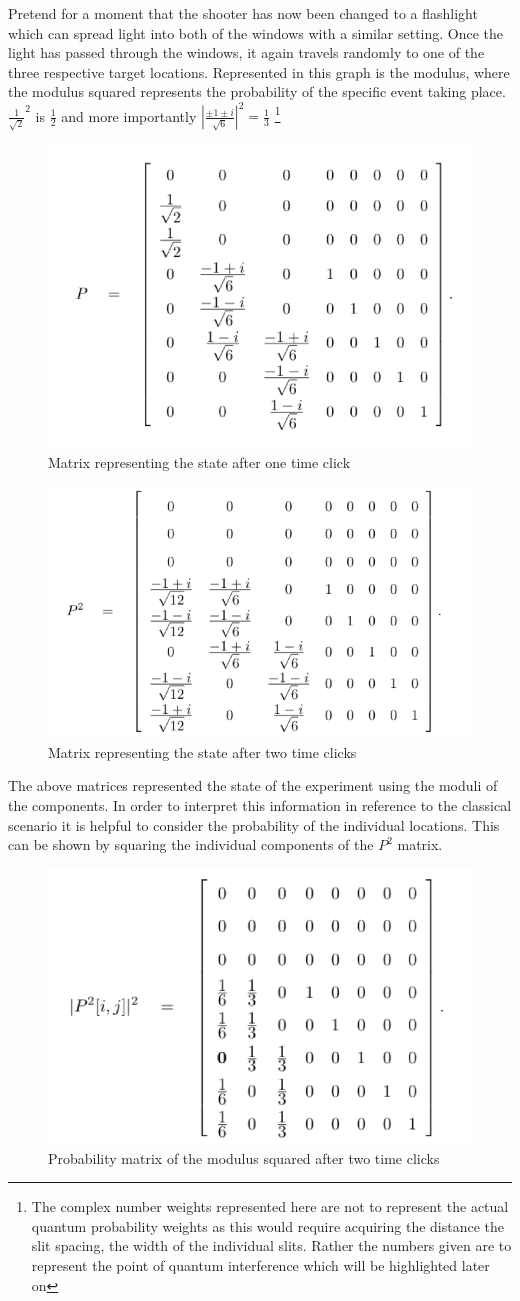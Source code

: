 \documentclass[12pt]{article}
\begin{document}
Pretend for a moment that the shooter has now been changed to a flashlight which can spread light into both of the windows with a similar setting. Once the light has passed through the windows, it again travels randomly to one of the three respective target locations. Represented in this graph is the modulus, where the modulus squared represents the probability of the specific event taking place. $\frac{1}{\sqrt{2}}^2$ is $\frac{1}{2}$ and more importantly $\left|\frac{\pm 1 \pm i }{\sqrt{6}}\right|^2 = \frac{1}{3}$  \footnote{The complex number weights represented here are not to represent the actual quantum probability weights as this would require acquiring the distance the slit spacing, the width of the individual slits. Rather the numbers given are to represent the point of quantum interference which will be highlighted later on}
\begin{figure}[!h]
	\centering
	\caption{Matrix representing the state after one time click}
	\includegraphics[width=.5\textwidth]{quantumP}
\end{figure}
\begin{figure}[!h]
	\centering
	\caption{Matrix representing the state after two time clicks}
	\includegraphics[width=.5\textwidth]{QuantumP2}
\end{figure}
The above matrices represented the state of the experiment using the moduli of the components. In order to interpret this information in reference to the classical scenario it is helpful to consider the probability of the individual locations. This can be shown by squaring the individual components of the $P^2$ matrix.
\begin{figure}[!h]
	\centering
	\caption{Probability matrix of the modulus squared after two time clicks}
	\includegraphics[width=.5\textwidth]{quantumProbability}
\end{figure}
\end{document}
